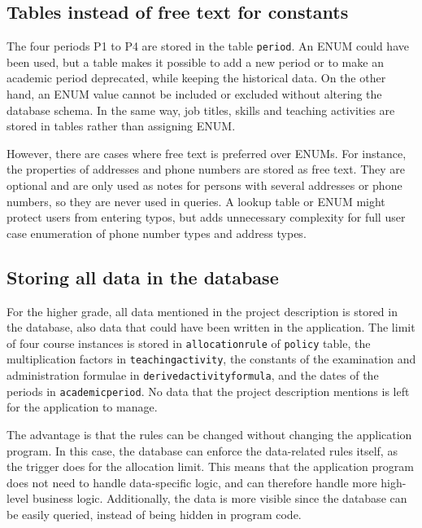 \documentclass[a4paper]{scrartcl}
\renewcommand{\_}{\textunderscore\allowbreak}
\begin{document}
\subsection{Tables instead of free text for constants}

The four periods P1 to P4 are stored in the table \texttt{period}. An ENUM could have been used, but a table makes it possible to add a new period or to make an academic period deprecated, while keeping the historical data. On the other hand, an ENUM value cannot be included or excluded without altering the database schema. In the same way, job titles, skills and teaching activities are stored in tables rather than assigning ENUM.

However, there are cases where free text is preferred over ENUMs. For instance, the properties of addresses and phone numbers are stored as free text. They are optional and are only used as notes for persons with several addresses or phone numbers, so they are never used in queries. A lookup table or ENUM might protect users from entering typos, but adds unnecessary complexity for full user case enumeration of phone number types and address types.

\subsection{Storing all data in the database}
\label{sec:alldata}

For the higher grade, all data mentioned in the project description is stored in the database, also data that could have been written in the application. The limit of four course instances is stored in \texttt{allocation\_rule} of \texttt{policy} table, the multiplication factors in \texttt{teaching\_activity}, the constants of the examination and administration formulae in \texttt{derived\_activity\_formula}, and the dates of the periods in \texttt{academic\_period}. No data that the project description mentions is left for the application to manage.

The advantage is that the rules can be changed without changing the application program. In this case, the database can enforce the data-related rules itself, as the trigger does for the allocation limit. This means that the application program does not need to handle data-specific logic, and can therefore handle more high-level business logic. Additionally, the data is more visible since the database can be easily queried, instead of being hidden in program code.
\end{document}
